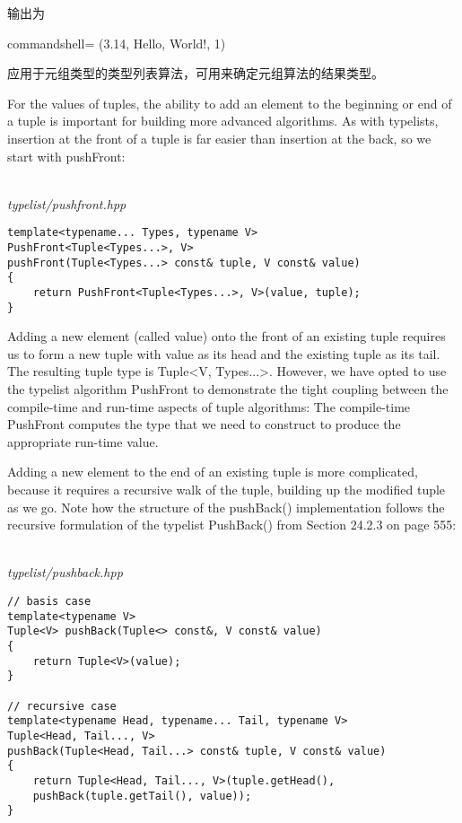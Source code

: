 输出为

\begin{tcblisting}{commandshell={}}
(3.14, Hello, World!, 1)
\end{tcblisting}

应用于元组类型的类型列表算法，可用来确定元组算法的结果类型。


For the values of tuples, the ability to add an element to the beginning or end of a tuple is important for building more advanced algorithms. As with typelists, insertion at the front of a tuple is far easier than insertion at the back, so we start with pushFront:

\hspace*{\fill} \\ %
\noindent
\textit{typelist/pushfront.hpp}
\begin{lstlisting}[style=styleCXX]
template<typename... Types, typename V>
PushFront<Tuple<Types...>, V>
pushFront(Tuple<Types...> const& tuple, V const& value)
{
	return PushFront<Tuple<Types...>, V>(value, tuple);
}
\end{lstlisting}

Adding a new element (called value) onto the front of an existing tuple requires us to form a new tuple with value as its head and the existing tuple as its tail. The resulting tuple type is Tuple<V, Types...>. However, we have opted to use the typelist algorithm PushFront to demonstrate the tight coupling between the compile-time and run-time aspects of tuple algorithms: The compile-time PushFront computes the type that we need to construct to produce the appropriate run-time value.

Adding a new element to the end of an existing tuple is more complicated, because it requires a recursive walk of the tuple, building up the modified tuple as we go. Note how the structure of the pushBack() implementation follows the recursive formulation of the typelist PushBack() from Section 24.2.3 on page 555:

\hspace*{\fill} \\ %
\noindent
\textit{typelist/pushback.hpp}
\begin{lstlisting}[style=styleCXX]
// basis case
template<typename V>
Tuple<V> pushBack(Tuple<> const&, V const& value)
{
	return Tuple<V>(value);
}

// recursive case
template<typename Head, typename... Tail, typename V>
Tuple<Head, Tail..., V>
pushBack(Tuple<Head, Tail...> const& tuple, V const& value)
{
	return Tuple<Head, Tail..., V>(tuple.getHead(),
	pushBack(tuple.getTail(), value));
}
\end{lstlisting}

